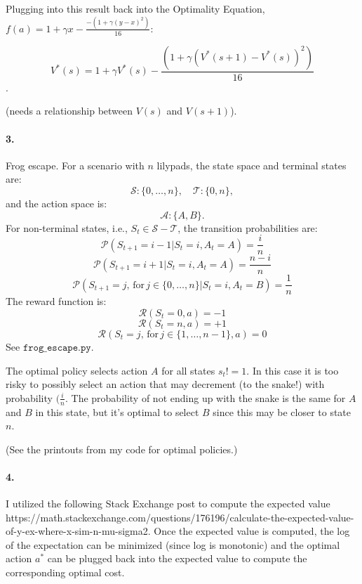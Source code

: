 \documentclass[12pt]{article}
\begin{document}
Plugging into this result back into the Optimality Equation, $f(a) = 1 + \gamma x - \frac{-(1 + \gamma (y - x)^2)}{16}$:

$$V^{*}(s) = 1 + \gamma V^{*}(s) - \frac{(1 + \gamma (V^{*}(s+1) - V^{*}(s))^2)}{16}$$.

(needs a relationship between $V(s)$ and $V(s+1)$).

\paragraph{3.} Frog escape. For a scenario with $n$ lilypads, the state space and terminal states are: 
$$\mathcal{S} : \{0, \dots, n\}, \quad \mathcal{T} : \{0, n\},$$
and the action space is:
$$\mathcal{A} : \{A, B\}.$$ For non-terminal states, i.e., $S_t \in \mathcal{S} - \mathcal{T}$, the transition probabilities are:
$$\mathcal{P}(S_{t+1} = i-1 | S_t = i, A_t = A) = \frac{i}{n}$$
$$\mathcal{P}(S_{t+1} = i+1 | S_t = i, A_t = A) = \frac{n-i}{n}$$
$$\mathcal{P}(S_{t+1} = j,\,\mbox{for}\, j \in \{0, \dots, n\} | S_t = i, A_t = B) = \frac{1}{n}$$
The reward function is:
$$\mathcal{R}(S_t = 0, a) = -1 $$
$$\mathcal{R}(S_t = n, a) = +1 $$
$$\mathcal{R}(S_{t} = j,\,\mbox{for}\,j \in \{1, \dots, n-1\}, a) = 0 $$
See $\texttt{frog\_escape.py}$.

The optimal policy selects action $A$ for all states $s_t != 1$. In this case it is too risky to possibly select an action that may decrement (to the snake!) with probability $(\frac{i}{n}$. The probability of not ending up with the snake is the same for $A$ and $B$ in this state, but it's optimal to select $B$ since this may be closer to state $n$.

(See the printouts from my code for optimal policies.)

\paragraph{4.} 

I utilized the following Stack Exchange post to compute the expected value https://math.stackexchange.com/questions/176196/calculate-the-expected-value-of-y-ex-where-x-sim-n-mu-sigma2. Once the expected value is computed, the log of the expectation can be minimized (since log is monotonic) and the optimal action $a^*$ can be plugged back into the expected value to compute the corresponding optimal cost.
\end{document}
